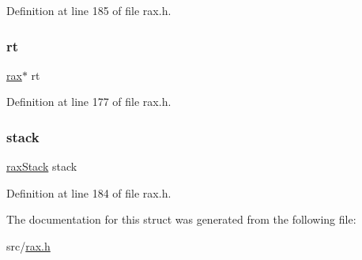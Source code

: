 Definition at line 185 of file rax.\+h.

\mbox{\label{structrax_iterator_a58939ec4439701d170853cf158043d57}} 
\subsubsection{\texorpdfstring{rt}{rt}}
{\footnotesize\ttfamily \hyperlink{structrax}{rax}$\ast$ rt}



Definition at line 177 of file rax.\+h.

\mbox{\label{structrax_iterator_ad25901300905129025788c7c8f27cb8e}} 
\subsubsection{\texorpdfstring{stack}{stack}}
{\footnotesize\ttfamily \hyperlink{structrax_stack}{rax\+Stack} stack}



Definition at line 184 of file rax.\+h.



The documentation for this struct was generated from the following file\+:\begin{DoxyCompactItemize}
\item 
src/\hyperlink{rax_8h}{rax.\+h}\end{DoxyCompactItemize}
